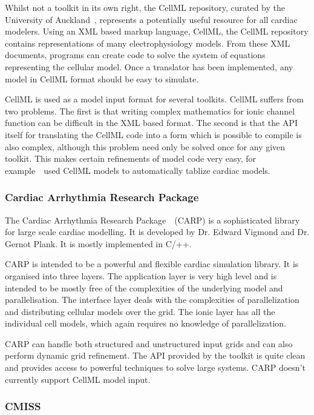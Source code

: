 Whilst not a toolkit in its own right, the CellML repository, curated by the
University of Auckland~\cite{Lloyd2008}, represents a potentially useful
resource for all cardiac modelers.
Using an XML based markup language, CellML, the CellML repository contains
representations of many electrophysiology models.
From these XML documents, programs can create code to solve the system of
equations representing the cellular model.
Once a translator has been implemented, any model in CellML format should be
easy to simulate.

CellML is used as a model input format for several toolkits.
CellML suffers from two problems.
The first is that writing complex mathematics for ionic channel function can be
difficult in the XML based format.
The second is that the API itself for translating the CellML code into a form
which is possible to compile is also complex, although this problem need only be
solved once for any given toolkit.
This makes certain refinements of model code very easy, for
example~\cite{Cooper2006}\ used CellML models to automatically tablize cardiac
models.


\subsubsection{Cardiac Arrhythmia Research Package}

The Cardiac Arrhythmia Research Package~\cite{Vigmond2003,Bauer2007,Plank2007,Vigmond2007}\
(CARP) is a sophisticated library for large scale cardiac modelling.
It is developed by Dr. Edward Vigmond and Dr. Gernot Plank.
It is mostly implemented in C/++.

CARP is intended to be a powerful and flexible cardiac simulation library.
It is organised into three layers.
The application layer is very high level and is intended to be mostly free of
the complexities of the underlying model and parallelisation.
The interface layer deals with the complexities of parallelization and
distributing cellular models over the grid.
The ionic layer has all the individual cell models, which again requires no
knowledge of parallelization.

CARP can handle both structured and unstructured input grids and can also
perform dynamic grid refinement.
The API provided by the toolkit is quite clean and provides access to powerful
techniques to solve large systems.
CARP doesn't currently support CellML model input.


\subsubsection{CMISS}

